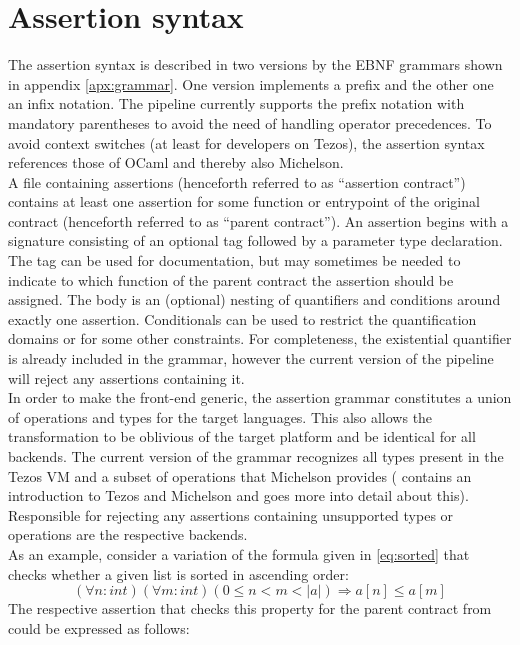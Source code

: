 \section{Assertion syntax}\label{sec:syntax}
The assertion syntax is described in two versions by the EBNF grammars shown in appendix \ref{apx:grammar}. One version implements a prefix and the other one an infix notation. The pipeline currently supports the prefix notation with mandatory parentheses to avoid the need of handling operator precedences. To avoid context switches (at least for developers on Tezos), the assertion syntax references those of OCaml and thereby also Michelson.\\
A file containing assertions (henceforth referred to as ``assertion contract'') contains at least one assertion for some function or entrypoint of the original contract (henceforth referred to as ``parent contract''). An assertion begins with a signature consisting of an optional tag followed by a parameter type declaration. The tag can be used for documentation, but may sometimes be needed to indicate to which function of the parent contract the assertion should be assigned. The body is an (optional) nesting of quantifiers and conditions around exactly one assertion. Conditionals can be used to restrict the quantification domains or for some other constraints. For completeness, the existential quantifier is already included in the grammar, however the current version of the pipeline will reject any assertions containing it. \\
In order to make the front-end generic, the assertion grammar constitutes a union of operations and types for the target languages. This also allows the transformation to be oblivious of the target platform and be identical for all backends. The current version of the grammar recognizes all types present in the Tezos VM and a subset of operations that Michelson provides (  contains an introduction to Tezos and Michelson and goes more into detail about this). Responsible for rejecting any assertions containing unsupported types or operations are the respective backends.\\

As an example, consider a variation of the formula given in \eqref{eq:sorted} that checks whether a given list is sorted in ascending order:
\begin{equation}\label{eq:sorted_v2}
	(\forall n : int)(\forall m : int) (0 \leq n < m < |a|) \Rightarrow a[n] \leq a[m]
\end{equation}
The respective assertion that checks this property for the parent contract from  could be expressed as follows:


